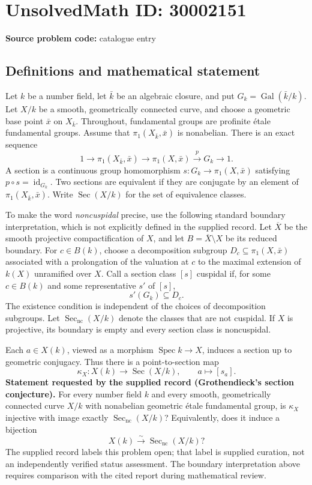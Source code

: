 \documentclass[11pt]{article}
\begin{document}
\section*{UnsolvedMath ID: 30002151}
\textbf{Source problem code:} catalogue entry
\subsection{Definitions and mathematical statement}
Let \(k\) be a number field, let \(\bar k\) be an algebraic closure, and put \(G_k=\operatorname{Gal}(\bar k/k)\). Let \(X/k\) be a smooth, geometrically connected curve, and choose a geometric base point \(\bar x\) on \(X_{\bar k}\). Throughout, fundamental groups are profinite étale fundamental groups. Assume that \(\pi_1(X_{\bar k},\bar x)\) is nonabelian. There is an exact sequence
\[
1\longrightarrow \pi_1(X_{\bar k},\bar x)\longrightarrow \pi_1(X,\bar x)\xrightarrow{p}G_k\longrightarrow 1.
\]
A section is a continuous group homomorphism \(s:G_k\to\pi_1(X,\bar x)\) satisfying \(p\circ s=\operatorname{id}_{G_k}\). Two sections are equivalent if they are conjugate by an element of \(\pi_1(X_{\bar k},\bar x)\). Write \(\operatorname{Sec}(X/k)\) for the set of equivalence classes.

To make the word \emph{noncuspidal} precise, use the following standard boundary interpretation, which is not explicitly defined in the supplied record. Let \(\overline X\) be the smooth projective compactification of \(X\), and let \(B=\overline X\setminus X\) be its reduced boundary. For \(c\in B(k)\), choose a decomposition subgroup \(D_c\subseteq\pi_1(X,\bar x)\) associated with a prolongation of the valuation at \(c\) to the maximal extension of \(k(X)\) unramified over \(X\). Call a section class \([s]\) cuspidal if, for some \(c\in B(k)\) and some representative \(s'\) of \([s]\),
\[
s'(G_k)\subseteq D_c.
\]
The existence condition is independent of the choices of decomposition subgroups. Let \(\operatorname{Sec}_{\mathrm{nc}}(X/k)\) denote the classes that are not cuspidal. If \(X\) is projective, its boundary is empty and every section class is noncuspidal.

Each \(a\in X(k)\), viewed as a morphism \(\operatorname{Spec}k\to X\), induces a section up to geometric conjugacy. Thus there is a point-to-section map
\[
\kappa_X:X(k)\longrightarrow\operatorname{Sec}(X/k),\qquad a\longmapsto[s_a].
\]
\textbf{Statement requested by the supplied record (Grothendieck's section conjecture).} For every number field \(k\) and every smooth, geometrically connected curve \(X/k\) with nonabelian geometric étale fundamental group, is \(\kappa_X\) injective with image exactly \(\operatorname{Sec}_{\mathrm{nc}}(X/k)\)? Equivalently, does it induce a bijection
\[
X(k)\xrightarrow{\sim}\operatorname{Sec}_{\mathrm{nc}}(X/k)?
\]
The supplied record labels this problem open; that label is supplied curation, not an independently verified status assessment. The boundary interpretation above requires comparison with the cited report during mathematical review.
\end{document}
